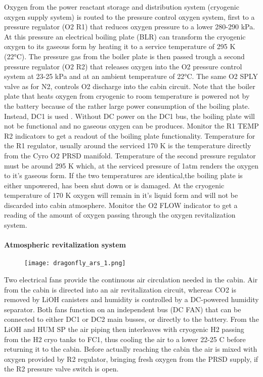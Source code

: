 \documentclass[Orbiter User Manual.tex]{subfiles}
\begin{document}
\noindent
Oxygen from the power reactant storage and distribution system (cryogenic oxygen supply system) is routed to the pressure control oxygen system, first to a pressure regulator (O2 R1) that reduces oxygen pressure to a lower 280-290 kPa. At this pressure an electrical boiling plate (BLR) can transform the cryogenic oxygen to its gaseous form by heating it to a service temperature of 295 K (22°C). The pressure gas from the boiler plate is then passed trough a second pressure regulator (O2 R2) that releases oxygen into the O2 pressure control system at 23-25 kPa and at an ambient temperature of 22°C. The same O2 SPLY valve as for N2, controls O2 discharge into the cabin circuit. Note that the boiler plate that heats oxygen from cryogenic to room temperature is powered not by the battery because of the rather large power consumption of the boiling plate. Instead, DC1 is used . Without DC power on the DC1 bus, the boiling plate will not be functional and no gaseous oxygen can be produces. Monitor the R1 TEMP R2 indicators to get a readout of the boiling plate functionality. Temperature for the R1 regulator, usually around the serviced 170 K is the temperature directly from the Cyro O2 PRSD manifold. Temperature of the second pressure regulator must be around 295 K which, at the serviced pressure of 1atm renders the oxygen to it's gaseous form. If the two temperatures are identical,the boiling plate is either unpowered, has been shut down or is damaged. At the cryogenic temperature of 170 K oxygen will remain in it's liquid form and will not be discarded into cabin atmosphere. Monitor the O2 FLOW indicator to get a reading of the amount of oxygen passing through the oxygen revitalization system.

\paragraph{Atmospheric revitalization system}

\begin{figure}[H]
  \centering
  \texttt{[image: dragonfly\_ars\_1.png]}
\end{figure}

\noindent
Two electrical fans provide the continuous air circulation needed in the cabin. Air from the cabin is directed into an air revitalization circuit, whereas CO2 is removed by LiOH canisters and humidity is controlled by a DC-powered humidity separator. Both fans function on an independent bus (DC FAN) that can be connected to either DC1 or DC2 main busses, or directly to the battery. From the LiOH and HUM SP the air piping then interleaves with cryogenic H2 passing from the H2 cryo tanks to FC1, thus cooling the air to a lower 22-25 C before returning it to the cabin. Before actually reaching the cabin the air is mixed with oxygen provided by R2 regulator, bringing fresh oxygen from the PRSD supply, if the R2 pressure valve switch is open.
\end{document}
